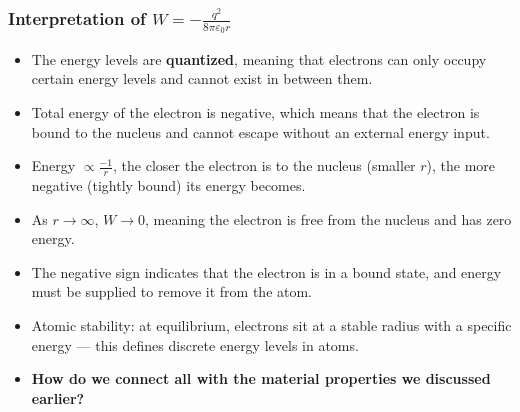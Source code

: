 \begin{frame}
	\frametitle{Interpretation of $W = -\frac{q^2}{8 \pi \varepsilon_0 r}$}
    \begin{itemize}
        \item The energy levels are \textbf{quantized}, meaning that electrons can only occupy certain energy levels and cannot exist in between them.
        \item Total energy of the electron is negative, which means that the electron is bound to the nucleus and cannot escape without an external energy input.
        \item Energy $\propto \frac{-1}{r}$, the closer the electron is to the nucleus (smaller $r$), the more negative (tightly bound) its energy becomes.
        \item As $r \rightarrow \infty$, $W \rightarrow 0$, meaning the electron is free from the nucleus and has zero energy.
        \item The negative sign indicates that the electron is in a bound state, and energy must be supplied to remove it from the atom.
        \item Atomic stability: at equilibrium, electrons sit at a stable radius with a specific energy — this defines discrete energy levels in atoms.
        \item \textbf{How do we connect all with the material properties we discussed earlier?}
    \end{itemize}
\end{frame}

